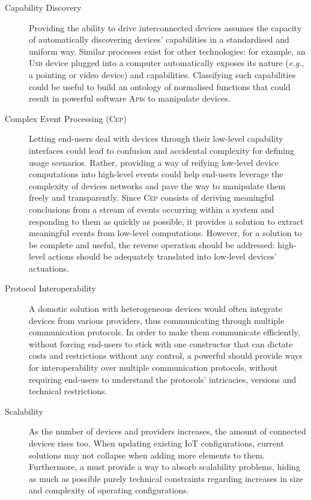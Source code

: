 \begin{description}
	\item[Capability Discovery] Providing the ability to drive interconnected devices assumes the capacity of automatically discovering devices' capabilities in a standardised and uniform way. Similar processes exist for other technologies: for example, an \textsc{Usb} device plugged into a computer automatically exposes its nature (\textit{e.g.}, a pointing or video device) and capabilities. Classifying such capabilities could be useful to build an ontology of normalised functions that could result in powerful software \textsc{Api}s to manipulate devices. 
		
	\item[Complex Event Processing (\textsc{Cep})] Letting end-users deal with devices through their low-level capability interfaces could lead to confusion and accidental complexity for defining usage scenarios. Rather, providing a way of reifying low-level device computations into high-level events could help end-users leverage the complexity of devices networks and pave the way to manipulate them freely and transparently. Since \textsc{Cep} consists of deriving meaningful conclusions from a stream of events occurring within a system and responding to them as quickly as possible, it provides a solution to extract meaningful events from low-level computations. However, for a solution to be complete and useful, the reverse operation should be addressed: high-level actions should be adequately translated into low-level devices' actuations. 
		
	\item[Protocol Interoperability] A domotic solution with heterogeneous devices would often integrate devices from various providers, thus communicating through multiple communication protocols. In order to make them communicate efficiently, without forcing end-users to stick with one constructor that can dictate costs and restrictions without any control, a powerful \DSL should provide ways for interoperability over multiple communication protocols, without requiring end-users to understand the protocols' intricacies, versions and technical restrictions.
	
	\item[Scalability] As the number of devices and providers increases, the amount of connected devices rises too. When updating existing IoT configurations, current solutions may not collapse when adding more elements to them. Furthermore, a \DSL must provide a way to absorb scalability problems, hiding as much as possible purely technical constraints regarding increases in size and complexity of operating configurations. 
	

\end{description}
